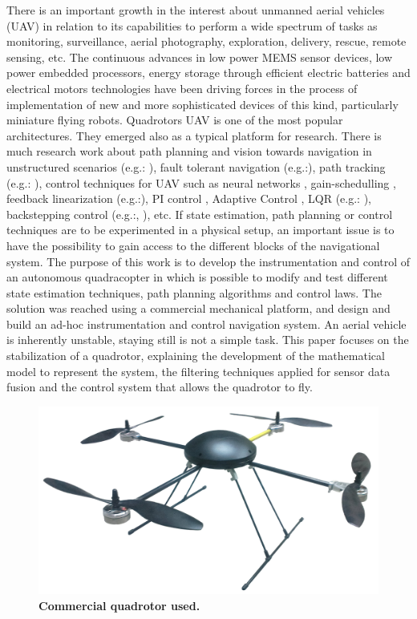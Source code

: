 \documentclass[conference]{IEEEtran}
\begin{document}
There is an important growth in the interest about unmanned aerial vehicles (UAV) in relation to its capabilities to perform a wide spectrum of tasks as monitoring, surveillance, aerial photography, exploration, delivery, rescue, remote sensing, etc.
The continuous advances in low power MEMS sensor devices, low power embedded processors, energy storage through efficient electric batteries and electrical motors technologies have been driving forces in the process of implementation of new and more sophisticated devices of this kind, particularly miniature flying robots. Quadrotors UAV is one of the most popular architectures.
They emerged also as a typical platform for research. There is much research work about path planning and vision towards navigation in unstructured scenarios (e.g.: \cite{bib:tio_cuatro, bib:tio_cinco, bib:tio_seis}), fault tolerant navigation (e.g.:\cite{bib:tio_tres}), path tracking (e.g.: \cite{bib:tio_ocho}), control techniques for UAV such as neural networks \cite{bib:tio_uno}, gain-schedulling \cite{bib:tio_tres}, feedback linearization (e.g.:\cite{bib:tio_seis, bib:tio_siete}), PI control \cite{bib:tio_ocho}, Adaptive Control \cite{bib:tio_dos}, LQR (e.g.: \cite{bib:tio_cinco, bib:lqrnotes}), backstepping control (e.g.:\cite{bib:tio_cuatro}, \cite{bib:tio_seis}), etc.
If state estimation, path planning or control techniques are to be experimented in a physical setup, an important issue is to have the possibility to gain access to the different blocks of the navigational system. 
The purpose of this work is to develop the instrumentation and control of an autonomous quadracopter in which is possible to modify and test different state estimation techniques, path planning algorithms and control laws. The solution was reached using a commercial mechanical platform, and design and build an ad-hoc instrumentation and control navigation system.
An aerial vehicle is inherently unstable, staying still is not a simple task. This paper focuses on the stabilization of a quadrotor, explaining the development of the mathematical model to represent the system, the filtering techniques applied for sensor data fusion and the control system that allows the quadrotor to fly.

\begin{figure}
	\centering
	\includegraphics[width=.8\columnwidth]{./pics_paper/javi.png}
	\caption{\textbf{Commercial quadrotor used.}}
	\label{fig:commercial_quadrotor}
\end{figure}
\end{document}
